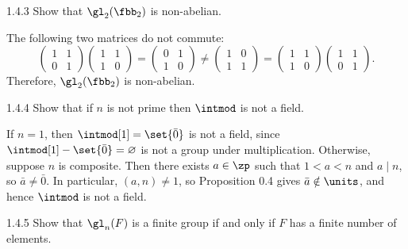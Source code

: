 \begin{exercise}{1.4.3}
    Show that $\gl_2(\fbb_2)$ is non-abelian.
\end{exercise}

\begin{sol}
    The following two matrices do not commute:
    \[
        \begin{pmatrix}
            1 & 1 \\
            0 & 1
        \end{pmatrix}
        \begin{pmatrix}
            1 & 1 \\
            1 & 0
        \end{pmatrix} = 
        \begin{pmatrix}
            0 & 1 \\
            1 & 0
        \end{pmatrix} \neq
        \begin{pmatrix}
            1 & 0 \\
            1 & 1
        \end{pmatrix} =
        \begin{pmatrix}
            1 & 1 \\
            1 & 0
        \end{pmatrix}
        \begin{pmatrix}
            1 & 1 \\
            0 & 1
        \end{pmatrix}.
    \]
    Therefore, $\gl_2(\fbb_2)$ is non-abelian.
\end{sol}

\begin{exercise}{1.4.4}
    Show that if $n$ is not prime then $\intmod$ is not a field.
\end{exercise}

\begin{sol}
    If $n = 1$, then $\intmod[1] = \set{\bar 0}$ is not a field, since $\intmod[1] - \set{\bar 0} = \varnothing$ is not a group under multiplication.
	Otherwise, suppose $n$ is composite.
    Then there exists $a \in \zp$ such that $1 < a < n$ and $a \mid n$, so $\bar a \neq \bar 0$.
    In particular, $(a, n) \neq 1$, so Proposition 0.4 gives $\bar a \notin \units$, and hence $\intmod$ is not a field.
\end{sol}

\begin{exercise}{1.4.5}
    Show that $\gl_n(F)$ is a finite group if and only if $F$ has a finite number of elements.
\end{exercise}

